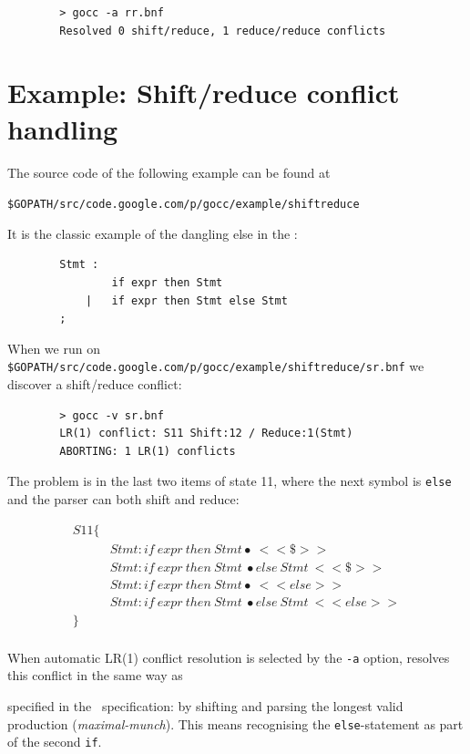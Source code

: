 \documentclass[12pt]{article}
\begin{document}
	\begin{verbatim}
		> gocc -a rr.bnf
		Resolved 0 shift/reduce, 1 reduce/reduce conflicts
	\end{verbatim}

\section{Example: Shift/reduce conflict handling} \label{sec:example sr}
	The source code of the following example can be found at

	\verb|$GOPATH/src/code.google.com/p/gocc/example/shiftreduce|

	It is the classic example of the dangling else in the \Clang:

	\begin{verbatim}
		Stmt :
		        if expr then Stmt
		    |   if expr then Stmt else Stmt
		;
	\end{verbatim}

	When we run \gocc on \verb|$GOPATH/src/code.google.com/p/gocc/example/shiftreduce/sr.bnf| we discover a shift/reduce conflict:

	\begin{verbatim}
		> gocc -v sr.bnf
		LR(1) conflict: S11 Shift:12 / Reduce:1(Stmt)
		ABORTING: 1 LR(1) conflicts
	\end{verbatim}

	The problem is in the last two items of state 11, where the next symbol is \verb|else| and the parser can both shift and reduce:

	\[
		\begin{array}{ll}
			S11 \{ \\
			  & Stmt : if\ expr\ then\ Stmt\bullet\ <<\$>> \\
			  & Stmt : if\ expr\ then\ Stmt\ \bullet else\ Stmt\ <<\$>> \\
			  & Stmt : if\ expr\ then\ Stmt \bullet\ <<else>> \\
			  & Stmt : if\ expr\ then\ Stmt\ \bullet else\ Stmt\ <<else>> \\
			\} \\
		\end{array}
	\]

	When automatic LR(1) conflict resolution is selected by the \verb|-a| option, \gocc resolves this conflict in the same way as 
	\

	specified in the \Clang\ specification: by shifting and parsing the longest valid production ({\em maximal-munch}). This means recognising the \verb|else|-statement as part of the second \verb|if|.
\end{document}
